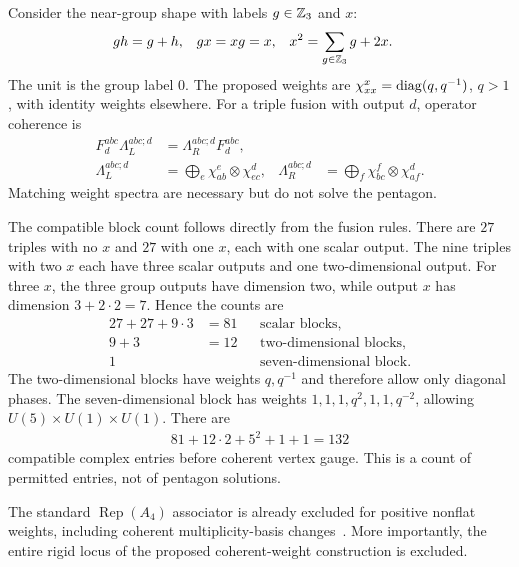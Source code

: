 \documentclass[aps,pra,reprint,nofootinbib,onecolumn]{revtex4-2}
\begin{document}
Consider the near-group shape with labels $g\in\mathbb{Z}_3$ and $x$:
\begin{align}
	gh & =g+h, & gx & =xg=x, & x^2 & =\sum_{g\in\mathbb{Z}_3}g+2x.
\end{align}
The unit is the group label $0$. The proposed weights are
$\chi_{xx}^{x}=\operatorname{diag}(q,q^{-1})$, $q>1$, with identity weights
elsewhere. For a triple fusion with output $d$, operator coherence is
\begin{align}
	F^{abc}_d\Lambda_L^{abc;d}
	 & =\Lambda_R^{abc;d}F^{abc}_d,
	\nonumber                                           \\
	\Lambda_L^{abc;d}
	 & =\bigoplus_e\chi_{ab}^{e}\otimes\chi_{ec}^{d}, &
	\Lambda_R^{abc;d}
	 & =\bigoplus_f\chi_{bc}^{f}\otimes\chi_{af}^{d}.
	\label{eq:weight-coherence}
\end{align}
Matching weight spectra are necessary but do not solve the pentagon.

The compatible block count follows directly from the fusion rules.
There are $27$ triples with no $x$ and $27$ with one $x$, each
with one scalar output. The nine triples with two $x$ each have
three scalar outputs and one two-dimensional output. For three $x$,
the three group outputs have dimension two, while output $x$ has
dimension $3+2\cdot2=7$. Hence the counts are
\begin{align}
	27+27+9\cdot3 & =81
	              &     & \text{scalar blocks},
	\nonumber                                                                              \\
	9+3           & =12
	              &     & \text{two-dimensional blocks},
	\nonumber                                                                              \\
	1             &     &                                & \text{seven-dimensional block}.
\end{align}
The two-dimensional blocks have weights $q,q^{-1}$ and therefore
allow only diagonal phases. The seven-dimensional block has weights
$1,1,1,q^2,1,1,q^{-2}$, allowing
$U(5)\times U(1)\times U(1)$. There are
\begin{align}
	81+12\cdot2+5^2+1+1=132
\end{align}
compatible complex entries before coherent vertex gauge. This is
a count of permitted entries, not of pentagon solutions.

The standard $\operatorname{Rep}(A_4)$ associator is already excluded
for positive nonflat weights, including coherent multiplicity-basis
changes~\cite{A4report}. More importantly, the entire rigid locus of
the proposed coherent-weight construction is excluded.
\end{document}
